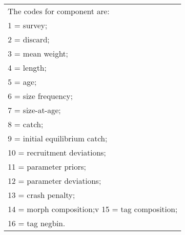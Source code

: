 \begin{center}
	\begin{longtable}{p{16cm}}
		The codes for component are:\\
		1 = survey;\\
		2 = discard;\\
		3 = mean weight;\\
		4 = length;\\
		5 = age; \\
		6 = size frequency;\\
		7 = size-at-age; \\
		8 = catch; \\
		9 = initial equilibrium catch;\\
	    10 = recruitment deviations; \\
		11 = parameter priors; \\
		12 = parameter deviations;\\
		13 = crash penalty; \\
		14 = morph composition;v
		15 = tag composition;\\
		16 = tag negbin.\\
	\end{longtable}
\end{center}

